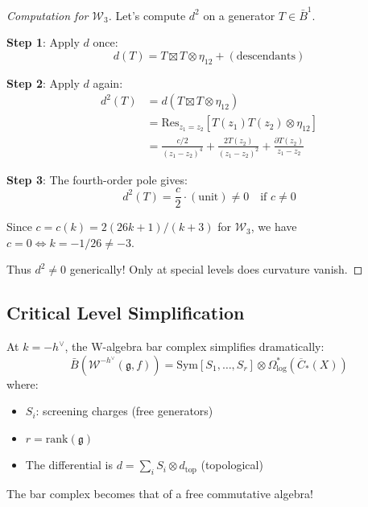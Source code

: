 \begin{proof}[Computation for $\mathcal{W}_3$]
Let's compute $d^2$ on a generator $T \in \bar{B}^1$.

\textbf{Step 1}: Apply $d$ once:
\begin{equation}
d(T) = T \boxtimes T \otimes \eta_{12} + (\text{descendants})
\end{equation}

\textbf{Step 2}: Apply $d$ again:
\begin{align}
d^2(T) &= d(T \boxtimes T \otimes \eta_{12}) \\
&= \mathrm{Res}_{z_1=z_2}[T(z_1) T(z_2) \otimes \eta_{12}] \\
&= \frac{c/2}{(z_1-z_2)^4} + \frac{2T(z_2)}{(z_1-z_2)^2} + \frac{\partial T(z_2)}{z_1-z_2}
\end{align}

\textbf{Step 3}: The fourth-order pole gives:
\begin{equation}
d^2(T) = \frac{c}{2} \cdot (\text{unit}) \neq 0 \quad \text{if } c \neq 0
\end{equation}

Since $c = c(k) = 2(26k+1)/(k+3)$ for $\mathcal{W}_3$, we have $c = 0 \iff k = -1/26 \neq -3$.

Thus $d^2 \neq 0$ generically! Only at special levels does curvature vanish.
\end{proof}

\subsection{Critical Level Simplification}

\begin{theorem}\label{thm:w-critical-bar}
At $k = -h^\vee$, the W-algebra bar complex simplifies dramatically:
\begin{equation}
\bar{B}(\mathcal{W}^{-h^\vee}(\mathfrak{g}, f)) = \text{Sym}[S_1, \ldots, S_r] \otimes \Omega^*_{\log}(\overline{C}_*(X))
\end{equation}
where:
\begin{itemize}
\item $S_i$: screening charges (free generators)
\item $r = \mathrm{rank}(\mathfrak{g})$
\item The differential is $d = \sum_i S_i \otimes d_{\text{top}}$ (topological)
\end{itemize}

The bar complex becomes that of a free commutative algebra!
\end{theorem}

